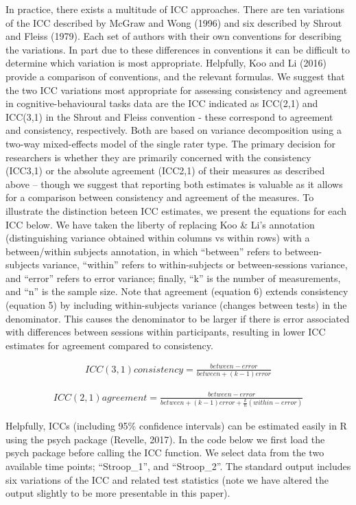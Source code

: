 \documentclass[english,,man,floatsintext]{apa6}
\begin{document}
In practice, there exists a multitude of ICC approaches. There are ten variations of the ICC described by McGraw and Wong (1996) and six described by Shrout and Fleiss (1979). Each set of authors with their own conventions for describing the variations. In part due to these differences in conventions it can be difficult to determine which variation is most appropriate. Helpfully, Koo and Li (2016) provide a comparison of conventions, and the relevant formulas. We suggest that the two ICC variations most appropriate for assessing consistency and agreement in cognitive-behavioural tasks data are the ICC indicated as ICC(2,1) and ICC(3,1) in the Shrout and Fleiss convention - these correspond to agreement and consistency, respectively. Both are based on variance decomposition using a two-way mixed-effects model of the single rater type. The primary decision for researchers is whether they are primarily concerned with the consistency (ICC3,1) or the absolute agreement (ICC2,1) of their measures as described above -- though we suggest that reporting both estimates is valuable as it allows for a comparison between consistency and agreement of the measures. To illustrate the distinction beteen ICC estimates, we present the equations for each ICC below. We have taken the liberty of replacing Koo \& Li's annotation (distinguishing variance obtained within columns vs within rows) with a between/within subjects annotation, in which \enquote{between} refers to between-subjects variance, \enquote{within} refers to within-subjects or between-sessions variance, and \enquote{error} refers to error variance; finally, \enquote{k} is the number of measurements, and \enquote{n} is the sample size. Note that agreement (equation 6) extends consistency (equation 5) by including within-subjects variance (changes between tests) in the denominator. This causes the denominator to be larger if there is error associated with differences between sessions within participants, resulting in lower ICC estimates for agreement compared to consistency.

\begin{align}
ICC(3,1) consistency=\frac{between - error}{between + (k-1)error}
\end{align}

\begin{align}
ICC(2,1) agreement=\frac{between - error}{between + (k-1)error + \frac{k}{n}(within - error)}
\end{align}

Helpfully, ICCs (including 95\% confidence intervals) can be estimated easily in R using the psych package (Revelle, 2017). In the code below we first load the psych package before calling the ICC function. We select data from the two available time points; \enquote{Stroop\_1}, and \enquote{Stroop\_2}. The standard output includes six variations of the ICC and related test statistics (note we have altered the output slightly to be more presentable in this paper).
\end{document}
